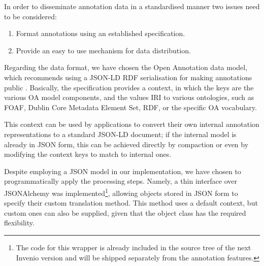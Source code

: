 
In order to disseminate annotation data in a standardised manner two issues
need to be considered:
\begin{enumerate}
  \item Format annotations using an established specification.
  \item Provide an easy to use mechanism for data distribution.
\end{enumerate}

Regarding the data format, we have chosen the Open Annotation data model, which
recommends using a JSON-LD RDF serialisation for making annotations public
\cite{ref:oa}. Basically, the specification provides a context, in which the
keys are the various OA model components, and the values IRI to various
ontologies, such as FOAF, Dublin Core Metadata Element Set, RDF, or the specific
OA vocabulary.

This context can be used by applications to convert their own internal
annotation representations to a standard JSON-LD document; if the internal
model is already in JSON form, this can be achieved directly by compaction or
even by modifying the context keys to match to internal ones.

Despite employing a JSON model in our implementation, we have chosen to
programmatically apply the processing steps. Namely, a thin interface over
JSONAlchemy was implemented\footnote{The code for this wrapper is already
included in the source tree of the next Invenio version and will be shipped
separately from the annotation features.}, allowing objects stored in JSON form
to specify their custom translation method. This method uses a default context,
but custom ones can also be supplied, given that the object class has the
required flexibility.

